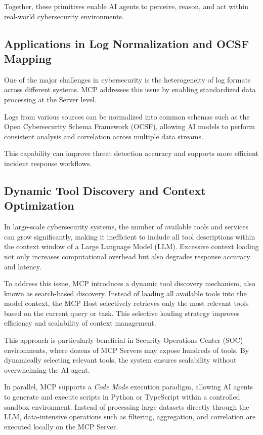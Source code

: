 \documentclass[12pt]{report}
\begin{document}
Together, these primitives enable AI agents to perceive, reason, and act within real-world cybersecurity environments.


\subsection{Applications in Log Normalization and OCSF Mapping}

One of the major challenges in cybersecurity is the heterogeneity of log formats across different systems. MCP addresses this issue by enabling standardized data processing at the Server level.

Logs from various sources can be normalized into common schemas such as the Open Cybersecurity Schema Framework (OCSF), allowing AI models to perform consistent analysis and correlation across multiple data streams.

This capability can improve threat detection accuracy and supports more efficient incident response workflows.
\subsection{Dynamic Tool Discovery and Context Optimization}

In large-scale cybersecurity systems, the number of available tools and services can grow significantly, making it inefficient to include all tool descriptions within the context window of a Large Language Model (LLM). Excessive context loading not only increases computational overhead but also degrades response accuracy and latency.

To address this issue, MCP introduces a dynamic tool discovery mechanism, also known as search-based discovery. Instead of loading all available tools into the model context, the MCP Host selectively retrieves only the most relevant tools based on the current query or task. This selective loading strategy improves efficiency and scalability of context management.

This approach is particularly beneficial in Security Operations Center (SOC) environments, where dozens of MCP Servers may expose hundreds of tools. By dynamically selecting relevant tools, the system ensures scalability without overwhelming the AI agent.

In parallel, MCP supports a \textit{Code Mode} execution paradigm, allowing AI agents to generate and execute scripts in Python or TypeScript within a controlled sandbox environment. Instead of processing large datasets directly through the LLM, data-intensive operations such as filtering, aggregation, and correlation are executed locally on the MCP Server.
\end{document}
